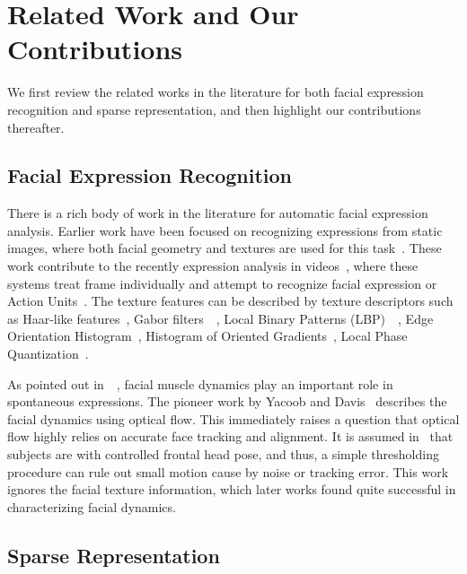 \documentclass[journal]{IEEEtran}
\begin{document}
\section{Related Work and Our Contributions\label{sec:related}}

We first review the related works in the literature for both facial expression recognition and sparse representation, and then highlight our contributions thereafter. 

\subsection{Facial Expression Recognition}

There is a rich body of work in the literature for automatic facial expression analysis. Earlier work have been focused on recognizing expressions from static images, where both facial geometry and textures are used for this task~\cite{Pantic_PAMI00}\cite{Essa_PAMI97}\cite{Donato_PAMI99}. These work contribute to the recently expression analysis in videos~\cite{Bartlett_FG11}\cite{Kaliouby_SMC04}\cite{Valstar_FERA11}, where these systems treat frame individually and attempt to recognize facial expression or Action Units~\cite{Ekman78}. The texture features can be described by texture descriptors such as Haar-like features~\cite{Whitehill_FG06}, Gabor filters~\cite{Lyons_PAMI99}~\cite{Bartlett_FG11}, Local Binary Patterns (LBP)~\cite{Shan_IVC09}~\cite{Jiang_FG11}, Edge Orientation Histogram~\cite{Levi_CVPR04}, Histogram of Oriented Gradients~\cite{}\cite{}, Local Phase Quantization~\cite{LPQ}.

As pointed out in~\cite{Ekman2005}~\cite{Ambadar05}, facial muscle dynamics play an important role in spontaneous expressions. The pioneer work by Yacoob and Davis~\cite{Yacoob_PAMI96} describes the facial dynamics using optical flow. This immediately raises a question that optical flow highly relies on accurate face tracking and alignment. It is assumed in~\cite{Yacoob_PAMI96} that subjects are with controlled frontal head pose, and thus, a simple thresholding procedure can rule out small motion cause by noise or tracking error. This work ignores the facial texture information, which later works found quite successful in characterizing facial dynamics. 


\subsection{Sparse Representation}
\end{document}

